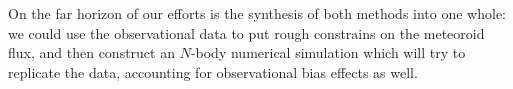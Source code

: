 On the far horizon of our efforts is the synthesis of both methods into one whole:
we could use the observational data to put rough constrains on the meteoroid flux,
and then construct an $N$-body numerical simulation which will try to replicate the data,
accounting for observational bias effects as well.
